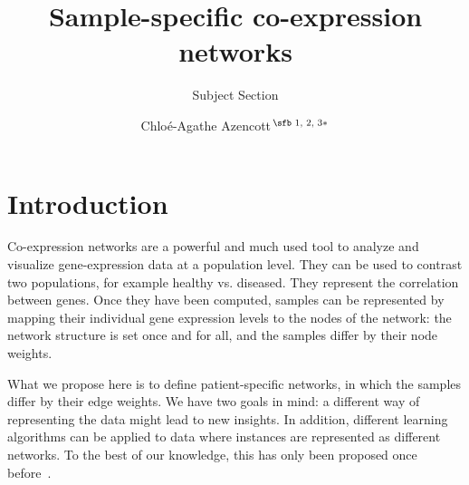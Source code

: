 \documentclass{bioinfo}
\begin{document}

\subtitle{Subject Section}

\title[Sample-specific co-expression networks]{Sample-specific co-expression networks}
\author[Azencott]{Chlo\'e-Agathe Azencott\,$^{\text{\sfb 1, 2, 3}*}$}
\address{$^{\text{\sf 1}}$MINES ParisTech, PSL-Research University, CBIO-Centre for Computational Biology, 35 rue St Honor\'e 77300 Fontainebleau, France\\
$^{\text{\sf 2}}$Institut Curie, 75248 Paris Cedex 05, France\\
$^{\text{\sf 3}}$INSERM, U900, 75248 Paris Cedex 05, France}





\maketitle

\section{Introduction}

Co-expression networks are a powerful and much used tool to analyze and visualize gene-expression data at a population level. 
They can be used to contrast two populations, for example healthy vs. diseased. 
They represent the correlation between genes.
Once they have been computed, samples can be represented by mapping their individual gene expression levels to the nodes of the network: the network structure is set once and for all, and the samples differ by their node weights.

What we propose here is to define patient-specific networks, in which the samples differ by their edge weights. We have two goals in mind: a different way of representing the data might lead to new insights. In addition, different learning algorithms can be applied to data where instances are represented as different networks. To the best of our knowledge, this has only been proposed once before~\citep{kuijjer2015}.
\end{document}
